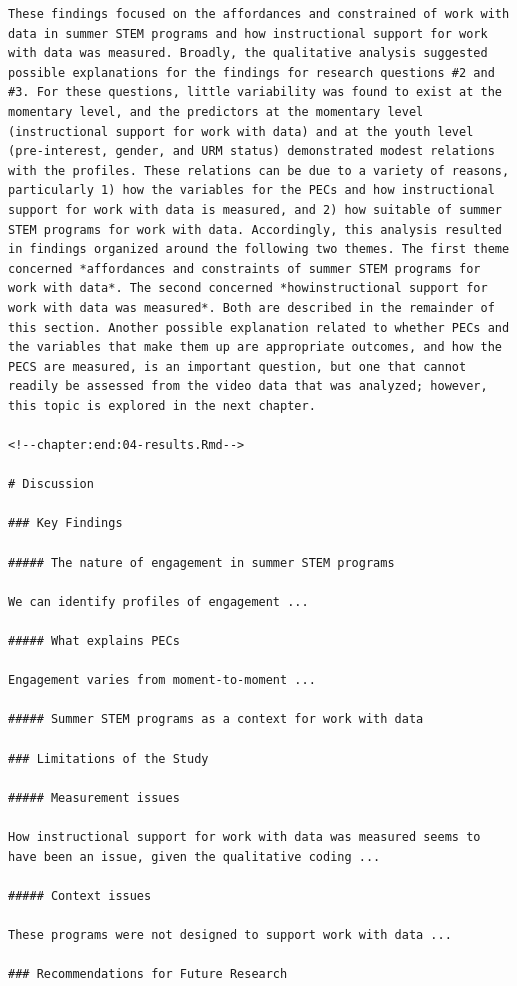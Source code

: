 \documentclass[]{msu-thesis}
\theoremstyle{definition}
\theoremstyle{definition}
\theoremstyle{definition}
\theoremstyle{remark}
\begin{document}
\begin{verbatim}
These findings focused on the affordances and constrained of work with data in summer STEM programs and how instructional support for work with data was measured. Broadly, the qualitative analysis suggested possible explanations for the findings for research questions #2 and #3. For these questions, little variability was found to exist at the momentary level, and the predictors at the momentary level (instructional support for work with data) and at the youth level (pre-interest, gender, and URM status) demonstrated modest relations with the profiles. These relations can be due to a variety of reasons, particularly 1) how the variables for the PECs and how instructional support for work with data is measured, and 2) how suitable of summer STEM programs for work with data. Accordingly, this analysis resulted in findings organized around the following two themes. The first theme concerned *affordances and constraints of summer STEM programs for work with data*. The second concerned *howinstructional support for work with data was measured*. Both are described in the remainder of this section. Another possible explanation related to whether PECs and the variables that make them up are appropriate outcomes, and how the PECS are measured, is an important question, but one that cannot readily be assessed from the video data that was analyzed; however, this topic is explored in the next chapter.

<!--chapter:end:04-results.Rmd-->

# Discussion

### Key Findings

##### The nature of engagement in summer STEM programs

We can identify profiles of engagement ...

##### What explains PECs

Engagement varies from moment-to-moment ...

##### Summer STEM programs as a context for work with data

### Limitations of the Study

##### Measurement issues

How instructional support for work with data was measured seems to have been an issue, given the qualitative coding ...

##### Context issues

These programs were not designed to support work with data ...

### Recommendations for Future Research


\end{verbatim}
\end{document}
